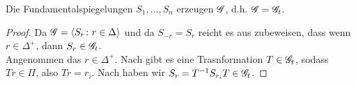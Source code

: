 \begin{theorem}
	Die Fundamentalspiegelungen $S_1, \dots, S_n$ erzeugen $\mathscr G$, d.h. $\mathscr G = \mathscr G_t$.
\end{theorem}
\begin{proof}
	Da $\mathscr G = \langle S_r \colon r \in \Delta\rangle$ und da $S_{-r} = S_r$ reicht es aus zubeweisen, dass wenn $r \in \Delta^+$, dann $S_r \in \mathscr G_t$.\\
	Angenommen das $r \in \Delta^+$. Nach  gibt es eine Trasnformation $T \in \mathscr G_t$, sodass $Tr \in \Pi$, also $Tr = r_i$. Nach  haben wir $S_r = T^{-1}S_{r_i}T \in \mathscr G_t$.
\end{proof}